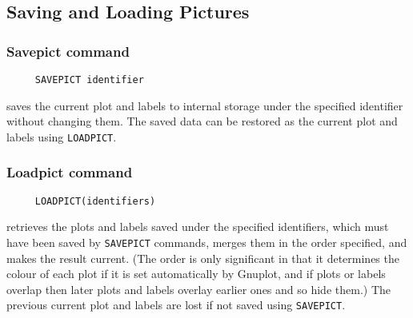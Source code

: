 \subsection{Saving and Loading Pictures}

\subsubsection*{Savepict command}
\begin{verbatim}
     SAVEPICT identifier
\end{verbatim}
\label{logoturtle:savepict}
saves the current plot and labels to internal storage under the
specified identifier without changing them.  The saved data can be
restored as the current plot and labels using \texttt{LOADPICT}.

\subsubsection*{Loadpict command}
\begin{verbatim}
     LOADPICT(identifiers)
\end{verbatim}
retrieves the plots and labels saved under the specified identifiers,
which must have been saved by \texttt{SAVEPICT} commands, merges them
in the order specified, and makes the result current. (The order is
only significant in that it determines the colour of each plot if it
is set automatically by Gnuplot, and if plots or labels overlap then
later plots and labels overlay earlier ones and so hide them.)  The
previous current plot and labels are lost if not saved using
\texttt{SAVEPICT}.
